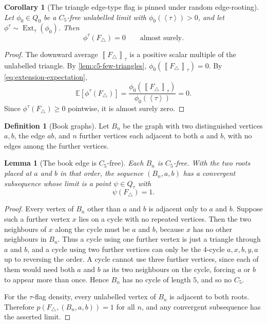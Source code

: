 \documentclass[11pt]{article}
\newtheorem{lemma}[lemma]{Lemma}
\newtheorem{corollary}[corollary]{Corollary}
\theoremstyle{definition}
\newtheorem{definition}[definition]{Definition}
\newcommand{\E}{\mathbb{E}}
\newcommand{\Ext}{\operatorname{Ext}}
\newcommand{\brak}[1]{\left\langle #1\right\rangle}
\newcommand{\avg}[2]{\left\llbracket #1 \right\rrbracket_{#2}}
\begin{document}
\begin{corollary}[The triangle edge-type flag is pinned under random edge-rooting]
\label{cor:c5-edge-pinned}
Let $\phi_0\in Q_0$ be a $C_5$-free unlabelled limit with
$\phi_0(\brak{\tau})>0$, and let $\phi^\tau\sim\Ext_\tau(\phi_0)$.  Then
\[
  \phi^\tau(F_\triangle)=0
  \qquad\text{almost surely.}
\]
\end{corollary}

\begin{proof}
The downward average $\avg{F_\triangle}{\tau}$ is a positive scalar multiple of the
unlabelled triangle.  By \cref{lem:c5-few-triangles},
$\phi_0(\avg{F_\triangle}{\tau})=0$.  By \eqref{eq:extension-expectation},
\[
  \E[\phi^\tau(F_\triangle)]
  =
  \frac{\phi_0(\avg{F_\triangle}{\tau})}{\phi_0(\brak{\tau})}
  =0.
\]
Since $\phi^\tau(F_\triangle)\ge0$ pointwise, it is almost surely zero.
\end{proof}

\begin{definition}[Book graphs]\label{def:c5-book}
Let $B_n$ be the graph with two distinguished vertices $a,b$, the edge $ab$,
and $n$ further vertices each adjacent to both $a$ and $b$, with no edges among
the further vertices.
\end{definition}

\begin{lemma}[The book edge is $C_5$-free]\label{lem:c5-book}
Each $B_n$ is $C_5$-free.  With the two roots placed at $a$ and $b$ in that order, the sequence
$(B_n,a,b)$ has a convergent subsequence whose limit is a point $\psi\in Q_\tau$
with
\[
  \psi(F_\triangle)=1.
\]
\end{lemma}

\begin{proof}
Every vertex of $B_n$ other than $a$ and $b$ is adjacent only to $a$ and $b$.
Suppose such a further vertex $x$ lies on a cycle with no repeated vertices.  Then the two
neighbours of $x$ along the cycle must be $a$ and $b$, because $x$ has no other
neighbours in $B_n$.  Thus a cycle using one further vertex is just a triangle through
$a$ and $b$, and a cycle using two further vertices can only be the $4$-cycle
$a,x,b,y,a$ up to reversing the order.  A cycle cannot use three further vertices, since
each of them would need both $a$ and $b$ as its two neighbours on the cycle, forcing $a$ or
$b$ to appear more than once.  Hence $B_n$ has no cycle of length $5$, and so no $C_5$.

For the $\tau$-flag density, every unlabelled vertex of $B_n$ is adjacent to both
roots.  Therefore $p(F_\triangle,(B_n,a,b))=1$ for all $n$, and any convergent subsequence
has the asserted limit.
\end{proof}
\end{document}
